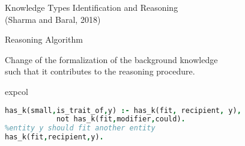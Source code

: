 \documentclass[svgnames, final, 20pt]{beamer} %
\begin{document}
\begin{frame}[fragile]
\begin{columns}[t]
\begin{block}{Knowledge Types Identification and Reasoning\\(Sharma and Baral, 2018)}

\begin{block}{Reasoning Algorithm}

 Change of the formalization of the background knowledge \\such that it contributes to the reasoning procedure. \\
 
\begin{beamercolorbox}[rounded=true,sep=0.3cm]{expcol}
 
\begin{lstlisting}[language = Prolog, style =SC, numbers=right,
numberstyle=\tiny]
%entity y is small if we know it could not fit another entity
has_k(small,is_trait_of,y) :- has_k(fit, recipient, y), 
			not has_k(fit,modifier,could).
%entity y should fit another entity 
has_k(fit,recipient,y).
\end{lstlisting}


\end{beamercolorbox}
\end{block}
\end{block}
\end{columns}
\end{frame}
\end{document}
